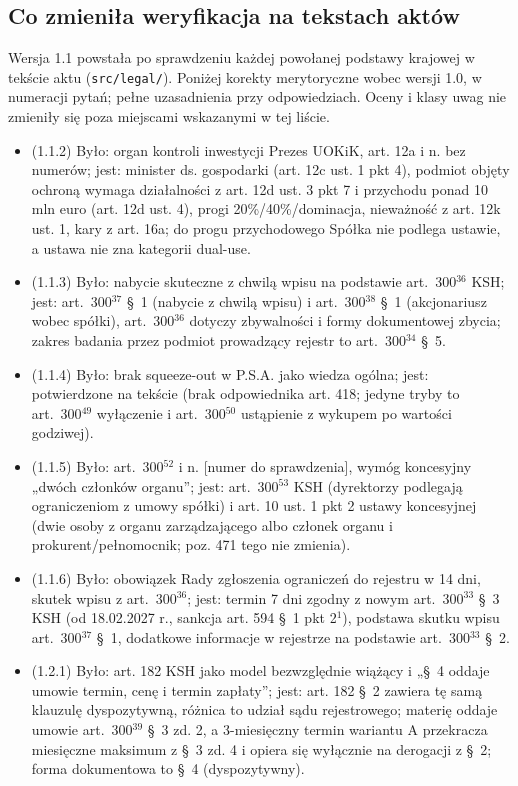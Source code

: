 \documentclass[12pt,a4paper]{report}
\begin{document}
\subsection*{Co zmieniła weryfikacja na tekstach aktów}
Wersja 1.1 powstała po sprawdzeniu każdej powołanej podstawy krajowej w tekście aktu (\texttt{src/legal/}). Poniżej korekty merytoryczne wobec wersji 1.0, w numeracji pytań; pełne uzasadnienia przy odpowiedziach. Oceny i klasy uwag nie zmieniły się poza miejscami wskazanymi w tej liście.
\begin{itemize}
  \item (1.1.2) Było: organ kontroli inwestycji Prezes UOKiK, art. 12a i n. bez numerów; jest: minister ds. gospodarki (art. 12c ust. 1 pkt 4), podmiot objęty ochroną wymaga działalności z art. 12d ust. 3 pkt 7 i przychodu ponad 10 mln euro (art. 12d ust. 4), progi 20\%/40\%/dominacja, nieważność z art. 12k ust. 1, kary z art. 16a; do progu przychodowego Spółka nie podlega ustawie, a ustawa nie zna kategorii dual-use.
  \item (1.1.3) Było: nabycie skuteczne z chwilą wpisu na podstawie art.~300$^{36}$ KSH; jest: art.~300$^{37}$ §~1 (nabycie z chwilą wpisu) i art.~300$^{38}$ §~1 (akcjonariusz wobec spółki), art.~300$^{36}$ dotyczy zbywalności i formy dokumentowej zbycia; zakres badania przez podmiot prowadzący rejestr to art.~300$^{34}$ §~5.
  \item (1.1.4) Było: brak squeeze-out w P.S.A. jako wiedza ogólna; jest: potwierdzone na tekście (brak odpowiednika art. 418; jedyne tryby to art.~300$^{49}$ wyłączenie i art.~300$^{50}$ ustąpienie z wykupem po wartości godziwej).
  \item (1.1.5) Było: art.~300$^{52}$ i n. [numer do sprawdzenia], wymóg koncesyjny „dwóch członków organu”; jest: art.~300$^{53}$ KSH (dyrektorzy podlegają ograniczeniom z umowy spółki) i art. 10 ust. 1 pkt 2 ustawy koncesyjnej (dwie osoby z organu zarządzającego albo członek organu i prokurent/pełnomocnik; poz. 471 tego nie zmienia).
  \item (1.1.6) Było: obowiązek Rady zgłoszenia ograniczeń do rejestru w 14 dni, skutek wpisu z art.~300$^{36}$; jest: termin 7 dni zgodny z nowym art.~300$^{33}$ §~3 KSH (od 18.02.2027 r., sankcja art. 594 §~1 pkt 2$^{1}$), podstawa skutku wpisu art.~300$^{37}$ §~1, dodatkowe informacje w rejestrze na podstawie art.~300$^{33}$ §~2.
  \item (1.2.1) Było: art. 182 KSH jako model bezwzględnie wiążący i „§~4 oddaje umowie termin, cenę i termin zapłaty”; jest: art. 182 §~2 zawiera tę samą klauzulę dyspozytywną, różnica to udział sądu rejestrowego; materię oddaje umowie art.~300$^{39}$ §~3 zd. 2, a 3-miesięczny termin wariantu A przekracza miesięczne maksimum z §~3 zd. 4 i opiera się wyłącznie na derogacji z §~2; forma dokumentowa to §~4 (dyspozytywny).

\end{itemize}
\end{document}
